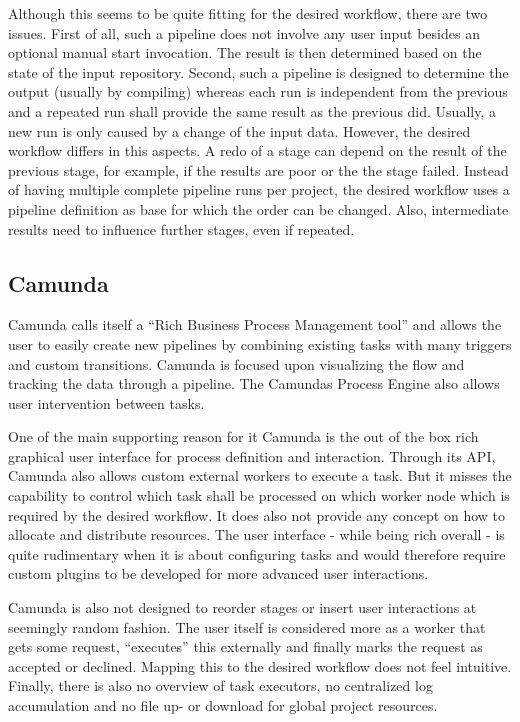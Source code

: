 Although this seems to be quite fitting for the desired workflow, there are two issues.
First of all, such a pipeline does not involve any user input besides an optional manual start invocation.
The result is then determined based on the state of the input repository.
Second, such a pipeline is designed to determine the output (usually by compiling) whereas each run is independent from the previous and a repeated run shall provide the same result as the previous did.
Usually, a new run is only caused by a change of the input data.
However, the desired workflow differs in this aspects.
A redo of a stage can depend on the result of the previous stage, for example, if the results are poor or the the stage failed.
Instead of having multiple complete pipeline runs per project, the desired workflow uses a pipeline definition as base for which the order can be changed.
Also, intermediate results need to influence further stages, even if repeated.


\subsection{Camunda}

Camunda\cite{camunda:main} calls itself a \enquote{Rich Business Process Management tool} and allows the user to easily create new pipelines by combining existing tasks with many triggers and custom transitions. %
Camunda is focused upon visualizing the flow and tracking the data through a pipeline. %
The Camundas Process Engine\cite{camunda:process_engine_api} also allows user intervention between tasks.

One of the main supporting reason for it Camunda is the out of the box rich graphical user interface for process definition and interaction.
Through its API\cite{camunda:rest_api_reference}, Camunda also allows custom external workers to execute a task.
But it misses the capability to control which task shall be processed on which worker node which is required by the desired workflow.
It does also not provide any concept on how to allocate and distribute resources.
The user interface - while being rich overall - is quite rudimentary when it is about configuring tasks and would therefore require custom plugins to be developed for more advanced user interactions.

Camunda is also not designed to reorder stages or insert user interactions at seemingly random fashion.
The user itself is considered more as a worker that gets some request, \enquote{executes} this externally and finally marks the request as accepted or declined.
Mapping this to the desired workflow does not feel intuitive.
Finally, there is also no overview of task executors, no centralized log accumulation and no file up- or download for global project resources.


